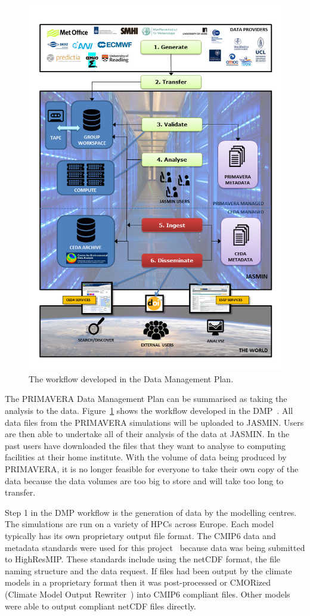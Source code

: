 \documentclass[gmd, manuscript]{copernicus}
\begin{document}
\begin{figure}[t]
\includegraphics[width=12cm]{fig01.png}
\caption{The workflow developed in the Data Management Plan.}
\label{dmp_workflow}
\end{figure}

The PRIMAVERA Data Management Plan can be summarised as taking the analysis to the data. Figure~\ref{dmp_workflow} shows the workflow developed in the DMP~\citep{Mizielinski2016}. All data files from the PRIMAVERA simulations will be uploaded to JASMIN. Users are then able to undertake all of their analysis of the data at JASMIN. In the past users have downloaded the files that they want to analyse to computing facilities at their home institute. With the volume of data being produced by PRIMAVERA, it is no longer feasible for everyone to take their own copy of the data because the data volumes are too big to store and will take too long to transfer.

Step 1 in the DMP workflow is the generation of data by the modelling centres. The simulations are run on a variety of HPCs across Europe. Each model typically has its own proprietary output file format. The CMIP6 data and metadata standards were used for this project~\citep{gmd-11-3659-2018} because data was being submitted to HighResMIP. These standards include using the netCDF format, the file naming structure and the data request. If files had been output by the climate models in a proprietary format then it was post-processed or CMORized (Climate Model Output Rewriter~\citep{Nadeau2019}) into CMIP6 compliant files. Other models were able to output compliant netCDF files directly.
\end{document}
